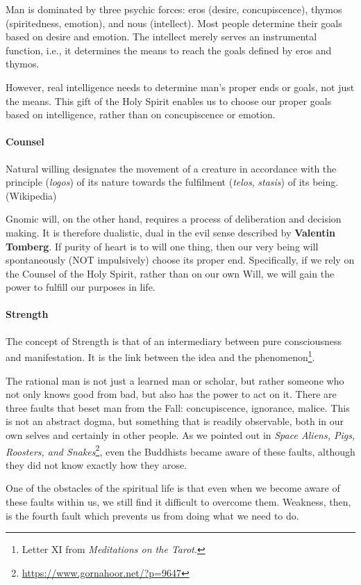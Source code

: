 Man is dominated by three psychic forces: eros (desire, concupiscence), thymos (spiritedness, emotion), and nous (intellect). Most people determine their goals based on desire and emotion. The intellect merely serves an instrumental function, i.e., it determines the means to reach the goals defined by eros and thymos.

However, real intelligence needs to determine man's proper ends or goals, not just the means. This gift of the Holy Spirit enables us to choose our proper goals based on intelligence, rather than on concupiscence or emotion.

\paragraph{Counsel}
Natural willing designates the movement of a creature in accordance with the principle (\emph{logos}) of its nature towards the fulfilment (\emph{telos}, \emph{stasis}) of its being. (Wikipedia)

Gnomic will, on the other hand, requires a process of deliberation and decision making. It is therefore dualistic, dual in the evil sense described by \textbf{Valentin Tomberg}. If purity of heart is to will one thing, then our very being will spontaneously (NOT impulsively) choose its proper end. Specifically, if we rely on the Counsel of the Holy Spirit, rather than on our own Will, we will gain the power to fulfill our purposes in life.

\paragraph{Strength}
The concept of Strength is that of an intermediary between pure consciousness and manifestation. It is the link between the idea and the phenomenon\footnote{Letter XI from \emph{Meditations on the Tarot}.}.

The rational man is not just a learned man or scholar, but rather someone who not only knows good from bad, but also has the power to act on it. There are three faults that beset man from the Fall: concupiscence, ignorance, malice. This is not an abstract dogma, but something that is readily observable, both in our own selves and certainly in other people. As we pointed out in \textit{Space Aliens, Pigs, Roosters, and Snakes}\footnote{\url{https://www.gornahoor.net/?p=9647}}, even the Buddhists became aware of these faults, although they did not know exactly how they arose.

One of the obstacles of the spiritual life is that even when we become aware of these faults within us, we still find it difficult to overcome them. Weakness, then, is the fourth fault which prevents us from doing what we need to do.

